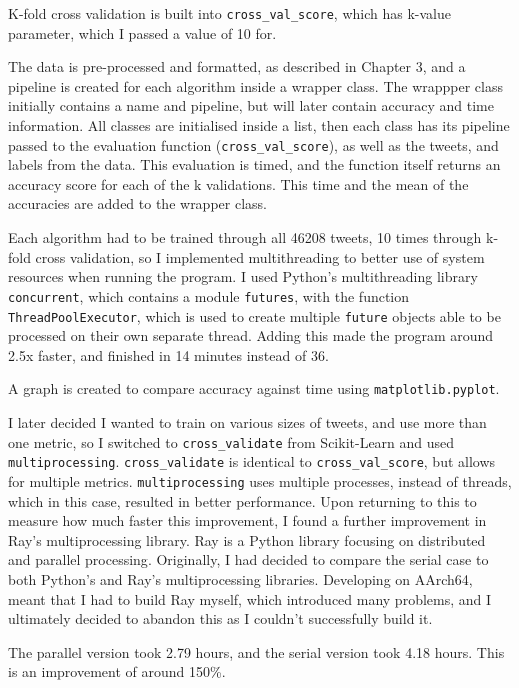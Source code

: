 \documentclass{article}
\begin{document}
K-fold cross validation is built into \lstinline{cross_val_score}, which has k-value parameter, which I passed a value of 10 for.

The data is pre-processed and formatted, as described in Chapter 3, and a pipeline is created for each algorithm inside a wrapper class.
The wrappper class initially contains a name and pipeline, but will later contain accuracy and time information.
All classes are initialised inside a list, then each class has its pipeline passed to the evaluation function (\lstinline{cross_val_score}), as well as the tweets, and labels from the data.
This evaluation is timed, and the function itself returns an accuracy score for each of the k validations.
This time and the mean of the accuracies are added to the wrapper class.

Each algorithm had to be trained through all 46208 tweets, 10 times through k-fold cross validation, so I implemented multithreading to better use of system resources when running the program.
I used Python's multithreading library \lstinline{concurrent}, which contains a module \lstinline{futures}, with the function \lstinline{ThreadPoolExecutor}, which is used to create multiple \lstinline{future} objects able to be processed on their own separate thread.
Adding this made the program around 2.5x faster, and finished in 14 minutes instead of 36.

A graph is created to compare accuracy against time using \lstinline{matplotlib.pyplot}.

I later decided I wanted to train on various sizes of tweets, and use more than one metric, so I switched to \lstinline{cross_validate} from Scikit-Learn and used \lstinline{multiprocessing}.
\lstinline{cross_validate} is identical to \lstinline{cross_val_score}, but allows for multiple metrics.
\lstinline{multiprocessing} uses multiple processes, instead of threads, which in this case, resulted in better performance.
Upon returning to this to measure how much faster this improvement, I found a further improvement in Ray's multiprocessing library\autocite[17]{nishihara_2020}.
Ray is a Python library focusing on distributed and parallel processing\autocite[17]{ray-project_2020}.
Originally, I had decided to compare the serial case to both Python's and Ray's multiprocessing libraries.
Developing on AArch64, meant that I had to build Ray myself, which introduced many problems, and I ultimately decided to abandon this as I couldn't successfully build it.

The parallel version took 2.79 hours, and the serial version took 4.18 hours.
This is an improvement of around 150\%.
\end{document}
